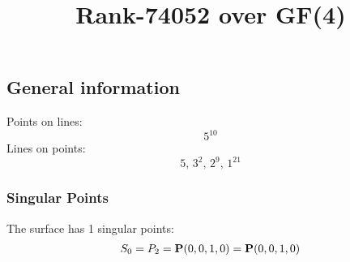 \documentclass{article}
\newcommand\setTBstruts{\def\T{\rule{0pt}{2.6ex}}%
\def\B{\rule[-1.2ex]{0pt}{0pt}}}
\newcommand{\bP}{{\bf P}}
\begin{document}
 
\setTBstruts



{\allowdisplaybreaks%






\title{Rank-74052 over GF(4)}
\author{}%
\maketitle%
%
{}



\subsection*{General information}
Points on lines:
$$
5^{10}$$
Lines on points:
$$
5,\,3^2,\,2^9,\,1^{21}$$
\subsubsection*{Singular Points}
The surface has 1 singular points:\\
\begin{align*}
S_{0} &= P_{2}=\bP(0, 0, 1, 0) = \bP(0, 0, 1, 0)\\
\end{align*}
}
\end{document}
